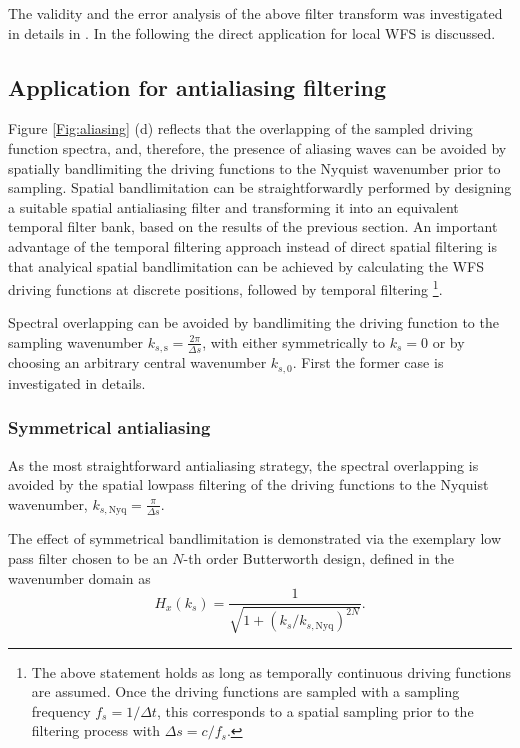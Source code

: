 \documentclass[conference]{IEEEtran}
\begin{document}
The validity and the error analysis of the above filter transform was investigated in details in \cite{firtha_daga2023}.
In the following the direct application for local WFS is discussed.

\subsection{Application for antialiasing filtering}

Figure \ref{Fig:aliasing} (d) reflects that the overlapping of the sampled driving function spectra, and, therefore, the presence of aliasing waves can be avoided by spatially bandlimiting the driving functions to the Nyquist wavenumber prior to sampling.
Spatial bandlimitation can be straightforwardly performed by designing a suitable spatial antialiasing filter and transforming it into an equivalent temporal filter bank, based on the results of the previous section.
An important advantage of the temporal filtering approach instead of direct spatial filtering is that analyical spatial bandlimitation can be achieved by calculating the WFS driving functions at discrete positions, followed by temporal filtering \footnote{
The above statement holds as long as temporally continuous driving functions are assumed. Once the driving functions are sampled with a sampling frequency $f_s = 1 /\Delta t$, this corresponds to a spatial sampling prior to the filtering process with $\Delta s = c/f_s$.}.

Spectral overlapping can be avoided by bandlimiting the driving function to the sampling wavenumber $k_{s,\mathrm{s}} = \frac{2\pi}{\Delta s}$, with either symmetrically to $k_s = 0$ or by choosing an arbitrary central wavenumber $k_{s,0}$.
First the former case is investigated in details.

\subsubsection{Symmetrical antialiasing}
As the most straightforward antialiasing strategy, the spectral overlapping is avoided by the spatial lowpass filtering of the driving functions to the Nyquist wavenumber, $k_{s,\mathrm{Nyq}} = \frac{\pi}{\Delta s}$.

The effect of symmetrical bandlimitation is demonstrated via the exemplary low pass filter chosen to be an $N$-th order Butterworth design, defined in the wavenumber domain as
\begin{equation}
    H_x(k_s) = \frac{ 1 }{ \sqrt{ 1 + \left( k_s / k_{s,\mathrm{Nyq}} \right)^{2N} } }.
\end{equation}
\end{document}

